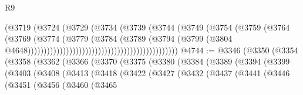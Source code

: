 \begin{lexlean}{R9}
\begin{coremodule}
                                                              (@3719
                                                                (@3724
                                                                  (@3729
                                                                    (@3734
                                                                      (@3739
                                                                        (@3744
                                                                          (@3749
                                                                            (@3754
                                                                              (@3759
                                                                                (@3764
                                                                                  (@3769
                                                                                    (@3774
                                                                                      (@3779
                                                                                        (@3784
                                                                                          (@3789
                                                                                            (@3794
                                                                                              (@3799
                                                                                                (@3804
                                                                                                  @4648)))))))))))))))))))))))))))))))))))))))))))))))
@4744 := @3346
    (@3350
      (@3354
        (@3358
          (@3362
            (@3366
              (@3370
                (@3375
                  (@3380
                    (@3384
                      (@3389
                        (@3394
                          (@3399
                            (@3403
                              (@3408
                                (@3413
                                  (@3418
                                    (@3422
                                      (@3427
                                        (@3432
                                          (@3437
                                            (@3441
                                              (@3446
                                                (@3451
                                                  (@3456
                                                    (@3460
                                                      (@3465

\end{coremodule}
\end{lexlean}
